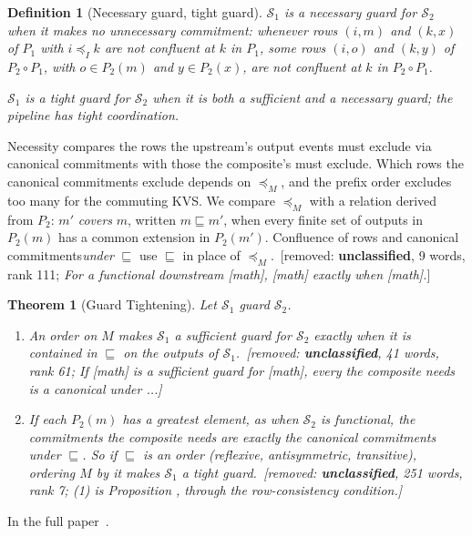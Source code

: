 \documentclass[sigconf]{cidr-2027}
\makeatletter
\newtheorem{theorem}{Theorem}
\newtheorem{definition}{Definition}
\theoremstyle{remark}
\newcommand{\InputOrd}{\preceq_I}
\newcommand{\commitment}{commitment\xspace}
\newcommand{\commitments}{commitments\xspace}
\newcommand{\Spec}{\mathcal{S}}
\newcommand{\proofinfull}{\par\pushQED{\qed}\normalfont\topsep2\p@\relax
  \trivlist\item[\@proofindent\hskip\labelsep{\@proofnamefont\proofname\@addpunct{.}}]%
  \ignorespaces In the full paper~\cite{hellerstein2026completecalmfull}.%
  \popQED\endtrivlist\@endpefalse}
\newcommand{\removednote}[1]{{\color{cutred}\footnotesize\,[removed: #1]\,}}
\makeatother
\begin{document}
\begin{definition}[Necessary guard, tight guard]
\label{def:necessary-guard}
\label{def:tight-guard}
$\Spec_1$ is a \emph{necessary guard} for $\Spec_2$ when it makes no
unnecessary \commitment: whenever rows $(i,m)$ and $(k,x)$
of $P_1$ with $i\InputOrd k$ are not confluent at $k$ in $P_1$, some rows
$(i,o)$ and $(k,y)$ of $P_2\circ P_1$, with $o\in P_2(m)$ and $y\in P_2(x)$,
are not confluent at $k$ in $P_2\circ P_1$.

\textcolor{newblue}{$\Spec_1$ is a \emph{tight guard} for $\Spec_2$ when it is both a
sufficient and a necessary guard; the pipeline has \emph{tight} coordination.}
\end{definition}

Necessity compares the rows the upstream's output events must exclude via
canonical \commitments with those the composite's must exclude. \textcolor{newblue}{Which rows the
canonical \commitments exclude depends on $\preceq_M$, and the prefix order
excludes too many for the commuting KVS.} We compare
$\preceq_M$ with a relation derived from $P_2$: $m'$ \emph{covers} $m$,
written $m\sqsubseteq m'$, when every finite set of outputs in $P_2(m)$ has a
common extension in $P_2(m')$. Confluence of rows and canonical
\commitments \emph{under} $\sqsubseteq$ use $\sqsubseteq$ in place of
$\preceq_M$. \removednote{\textbf{unclassified}, 9 words, rank 111; \textit{For a functional downstream [math], [math] exactly when [math].}}

\begin{theorem}[Guard Tightening]
\label{thm:guard-tightening}
Let $\Spec_1$ guard $\Spec_2$.
\begin{enumerate}
\item
An order on $M$ makes $\Spec_1$ a sufficient guard for $\Spec_2$
        exactly when it is contained in $\sqsubseteq$ on the outputs of
        $\Spec_1$. \removednote{\textbf{unclassified}, 41 words, rank 61; \textit{If [math] is a sufficient guard for [math], every the composite needs is a canonical under ...}}
\item
\textcolor{newblue}{If each $P_2(m)$ has a greatest element, as when $\Spec_2$ is
        functional, the \commitments the composite needs are exactly the
        canonical \commitments under $\sqsubseteq$.} So if $\sqsubseteq$ is an
        order (reflexive, antisymmetric, transitive), ordering $M$ by it makes
        $\Spec_1$ a tight guard. \removednote{\textbf{unclassified}, 251 words, rank 7; \textit{(1) is Proposition , through the row-consistency condition.}}
\end{enumerate}
\end{theorem}
\textcolor{newblue}{\proofinfull}
\end{document}
